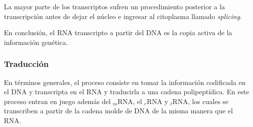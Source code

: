 

\par La mayor parte de los transcriptos sufren un procedimiento posterior a la transcripción antes de dejar el núcleo e ingresar al citoplasma llamado \textit{splicing}.
\par En conclusión, el RNA transcripto a partir del DNA es la copia activa de la información genética.


\subsubsection{Traducción} 
\label{sintesisProteica}
En términos generales, el proceso consiste en tomar la información codificada en el DNA y transcripta en el RNA y traducirla a una cadena polipeptídica.
En este proceso entran en juego además del $_m$RNA, el $_r$RNA y $_t$RNA, los cuales se transcriben a partir de la cadena molde de DNA de la misma manera que el RNA.

